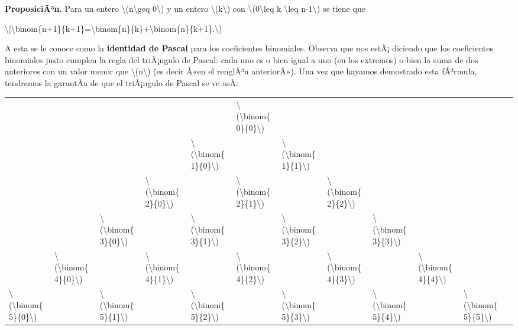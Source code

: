 \documentclass[
]{article}
\begin{document}
\textbf{ProposiciÃ³n.} Para un entero
{\textbackslash(n\textbackslash geq 0\textbackslash)} y un entero
{\textbackslash(k\textbackslash)} con
{\textbackslash(0\textbackslash leq k \textbackslash leq
n-1\textbackslash)} se tiene que

\textbackslash{[}\textbackslash binom\{n+1\}\{k+1\}=\textbackslash binom\{n\}\{k\}+\textbackslash binom\{n\}\{k+1\}.\textbackslash{]}

A esta se le conoce como la \textbf{identidad de Pascal} para los
coeficientes binomiales. Observa que nos estÃ¡ diciendo que los
coeficientes binomiales justo cumplen la regla del triÃ¡ngulo de Pascal:
cada uno es o bien igual a uno (en los extremos) o bien la suma de dos
anteriores con un valor menor que {\textbackslash(n\textbackslash)} (es
decir Â«en el renglÃ³n anteriorÂ»). Una vez que hayamos demostrado esta
fÃ³rmula, tendremos la garantÃ­a de que el triÃ¡ngulo de Pascal se ve
asÃ­:

\begin{longtable}[]{@{}llllllllllll@{}}
\toprule\noalign{}
& & & & & & & & & & & \\
\midrule\noalign{}
\endhead
\bottomrule\noalign{}
\endlastfoot
& & & & & {\textbackslash(\textbackslash binom\{0\}\{0\}\textbackslash)}
& & & & & & \\
& & & & {\textbackslash(\textbackslash binom\{1\}\{0\}\textbackslash)} &
& {\textbackslash(\textbackslash binom\{1\}\{1\}\textbackslash)} & & & &
& \\
& & & {\textbackslash(\textbackslash binom\{2\}\{0\}\textbackslash)} & &
{\textbackslash(\textbackslash binom\{2\}\{1\}\textbackslash)} & &
{\textbackslash(\textbackslash binom\{2\}\{2\}\textbackslash)} & & &
& \\
& & {\textbackslash(\textbackslash binom\{3\}\{0\}\textbackslash)} & &
{\textbackslash(\textbackslash binom\{3\}\{1\}\textbackslash)} & &
{\textbackslash(\textbackslash binom\{3\}\{2\}\textbackslash)} & &
{\textbackslash(\textbackslash binom\{3\}\{3\}\textbackslash)} & & & \\
& {\textbackslash(\textbackslash binom\{4\}\{0\}\textbackslash)} & &
{\textbackslash(\textbackslash binom\{4\}\{1\}\textbackslash)} & &
{\textbackslash(\textbackslash binom\{4\}\{2\}\textbackslash)} & &
{\textbackslash(\textbackslash binom\{4\}\{3\}\textbackslash)} & &
{\textbackslash(\textbackslash binom\{4\}\{4\}\textbackslash)} & & \\
{\textbackslash(\textbackslash binom\{5\}\{0\}\textbackslash)} & &
{\textbackslash(\textbackslash binom\{5\}\{1\}\textbackslash)} & &
{\textbackslash(\textbackslash binom\{5\}\{2\}\textbackslash)} & &
{\textbackslash(\textbackslash binom\{5\}\{3\}\textbackslash)} & &
{\textbackslash(\textbackslash binom\{5\}\{4\}\textbackslash)} & &
{\textbackslash(\textbackslash binom\{5\}\{5\}\textbackslash)} & \\
\end{longtable}
\end{document}

